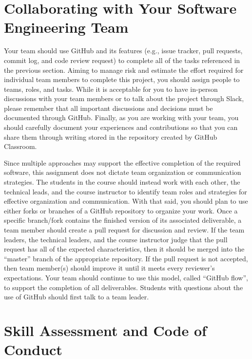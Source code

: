 \documentclass[11pt]{article}
\begin{document}
\section*{Collaborating with Your Software Engineering Team}

Your team should use GitHub and its features (e.g., issue tracker, pull
requests, commit log, and code review request) to complete all of the tasks
referenced in the previous section.
%
Aiming to manage risk and estimate the effort required for individual team
members to complete this project, you should assign people to teams, roles, and
tasks. While it is acceptable for you to have in-person discussions with your
team members or to talk about the project through Slack, please remember that
all important discussions and decisions must be documented through GitHub.
Finally, as you are working with your team, you should carefully document your
experiences and contributions so that you can share them through writing stored
in the repository created by GitHub Classroom.

Since multiple approaches may support the effective completion of the required
software, this assignment does not dictate team organization or communication
strategies. The students in the course should instead work with each other, the
technical leads, and the course instructor to identify team roles and strategies
for effective organization and communication. With that said, you should plan to
use either forks or branches of a GitHub repository to organize your work.
%
Once a specific branch/fork contains the finished version of its associated
deliverable, a team member should create a pull request for discussion and
review. If the team leaders, the technical leaders, and the course instructor
judge that the pull request has all of the expected characteristics, then it
should be merged into the ``master'' branch of the appropriate repository. If
the pull request is not accepted, then team member(s) should improve it until it
meets every reviewer's expectations. Your team should continue to use this
model, called ``GitHub flow'', to support the completion of all deliverables.
%
Students with questions about the use of GitHub should first talk to a team
leader.

\section*{Skill Assessment and Code of Conduct}

\end{document}
